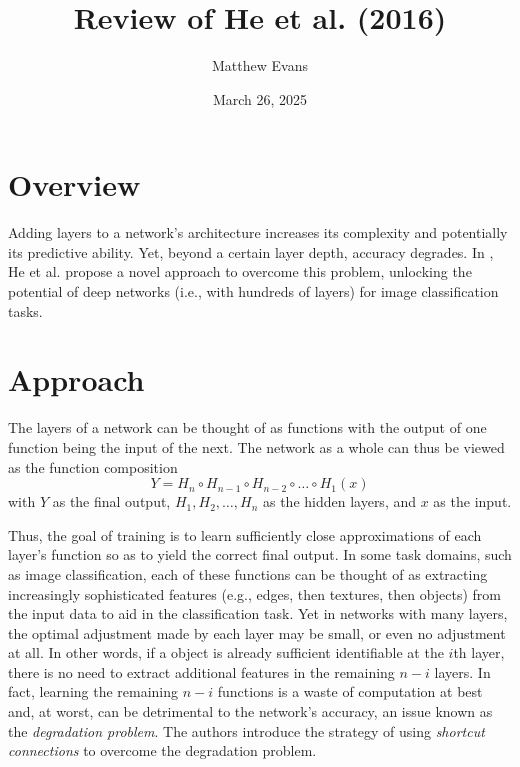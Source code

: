 \documentclass[10pt]{article}
\title{
    Review of He et al. (2016) \\
}
\author{Matthew Evans}
\date{March 26, 2025}
\begin{document}
\maketitle

\section*{Overview}
Adding layers to a network's architecture increases its complexity and potentially its predictive ability. Yet, beyond a certain layer depth, accuracy degrades. In \cite{7780459},  He et al. propose a novel approach to overcome this problem, unlocking the potential of deep networks (i.e., with hundreds of layers) for image classification tasks.


\section*{Approach}

The layers of a network can be thought of as functions with the output of one function being the input of the next. The network as a whole can thus be viewed as the function composition
\[
    Y = H_n \circ H_{n-1}\circ H_{n-2} \circ \dots \circ H_{1}(x)
\]
with \(Y\) as the final output, \(H_1, H_2, \dots, H_{n}\) as the hidden layers, and \(x\) as the input.

Thus, the goal of training is to learn sufficiently close approximations of each layer's function so as to yield the correct final output. In some task domains, such as image classification, each of these functions can be thought of as extracting increasingly sophisticated features (e.g., edges, then textures, then objects) from the input data to aid in the classification task. Yet in networks with many layers, the optimal adjustment made by each layer may be small, or even no adjustment at all. In other words, if a object is already sufficient identifiable at the \(i\)th layer, there is no need to extract additional features in the remaining \(n-i\) layers. In fact, learning the remaining \(n-i\) functions is a waste of computation at best and, at worst, can be detrimental to the network's accuracy, an issue known as the \textit{degradation problem}. The authors introduce the strategy of using \textit{shortcut connections} to overcome the degradation problem.
\end{document}

